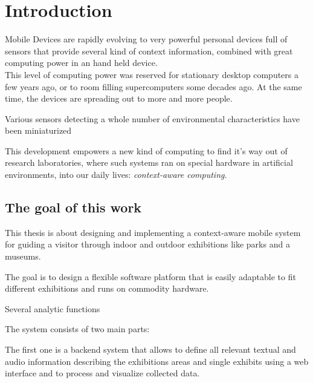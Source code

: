 
\chapter{Introduction} %

\label{introduction} %




Mobile Devices are rapidly evolving to very powerful personal devices full of sensors that provide several kind of context information, combined with great computing power in an hand held device. \\
This level of computing power was reserved for stationary desktop computers a few years ago, or to room filling supercomputers some decades ago.
At the same time, the devices are spreading out to more and more people.

Various sensors detecting a whole number of environmental characteristics have been miniaturized 

This development empowers a new kind of computing to find it's way out of research laboratories, where such systems ran on special hardware in artificial environments, into our daily lives: \cite[cf.][]{age-of-context}
\emph{context-aware computing}. 


\section{The goal of this work}

This thesis is about designing and implementing a context-aware mobile system for guiding a visitor through indoor and outdoor exhibitions like parks and a museums.

The goal is to design a flexible software platform that is easily adaptable to fit different exhibitions and runs on commodity hardware. 

Several analytic functions 

The system consists of two main parts:

The first one is a backend system that allows to define all relevant textual and audio information describing the exhibitions areas and single exhibits using a web interface and to process and visualize collected data.

